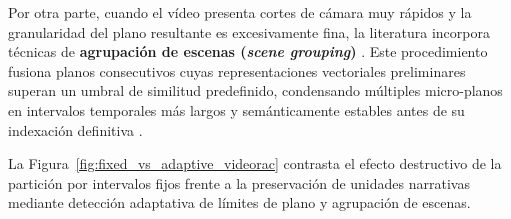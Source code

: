 Por otra parte, cuando el vídeo presenta cortes de cámara muy rápidos y la granularidad del plano resultante es excesivamente fina, la literatura incorpora técnicas de \textbf{agrupación de escenas (\textit{scene grouping})} \cite{mixpeek_chunking}. %
Este procedimiento fusiona planos consecutivos cuyas representaciones vectoriales preliminares superan un umbral de similitud predefinido, condensando múltiples micro-planos en intervalos temporales más largos y semánticamente estables antes de su indexación definitiva \cite{mixpeek_chunking}. %

La Figura~\ref{fig:fixed_vs_adaptive_videorac} contrasta el efecto destructivo de la partición por intervalos fijos frente a la preservación de unidades narrativas mediante detección adaptativa de límites de plano y agrupación de escenas. %

